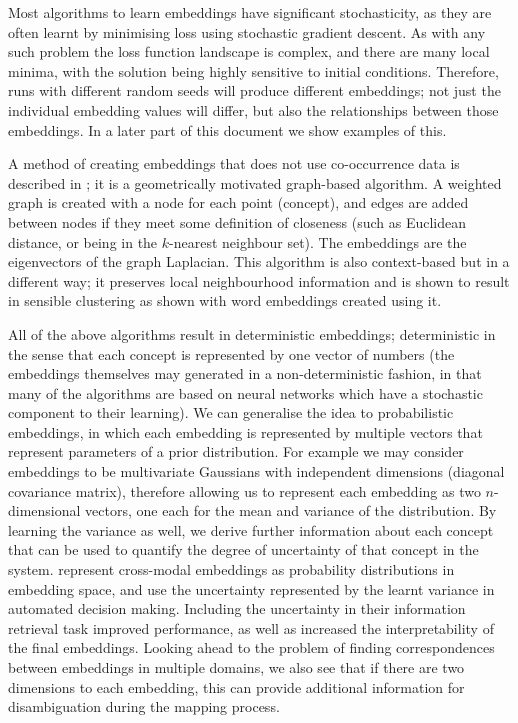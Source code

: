 Most algorithms to learn embeddings have significant stochasticity, as they are often learnt by minimising loss using stochastic gradient descent. As with any such problem the loss function landscape is complex, and there are many local minima, with the solution being highly sensitive to initial conditions. Therefore, runs with different random seeds will produce different embeddings; not just the individual embedding values will differ, but also the relationships between those embeddings. In a later part of this document we show examples of this. 



A method of creating embeddings that does not use co-occurrence data is described in \cite{LaplacianEigenmaps}; it is a geometrically motivated graph-based algorithm. A weighted graph is created with a node for each point (concept), and edges are added between nodes if they meet some definition of closeness (such as Euclidean distance, or being in the $k$-nearest neighbour set). The embeddings are the eigenvectors of the graph Laplacian. This algorithm is also context-based but in a different way; it preserves local neighbourhood information and is shown to result in sensible clustering as shown with word embeddings created using it. 

All of the above algorithms result in deterministic embeddings; deterministic in the sense that each concept is represented by one vector of numbers (the embeddings themselves may generated in a non-deterministic fashion, in that many of the algorithms are based on neural networks which have a stochastic component to their learning). We can generalise the idea to probabilistic embeddings, in which each embedding is represented by multiple vectors that represent parameters of a prior distribution. For example we may consider embeddings to be multivariate Gaussians with independent dimensions (diagonal covariance matrix), therefore allowing us to represent each embedding as two $n$-dimensional vectors, one each for the mean and variance of the distribution. By learning the variance as well, we derive further information about each concept that can be used to quantify the degree of uncertainty of that concept in the system. \cite{ProbabilisticEmbeddingsCrossModal} represent cross-modal embeddings as probability distributions in embedding space, and use the uncertainty represented by the learnt variance in automated decision making. Including the uncertainty in their information retrieval task improved performance, as well as increased the interpretability of the final embeddings. Looking ahead to the problem of finding correspondences between embeddings in multiple domains, we also see that if there are two dimensions to each embedding, this can provide additional information for disambiguation during the mapping process. 

